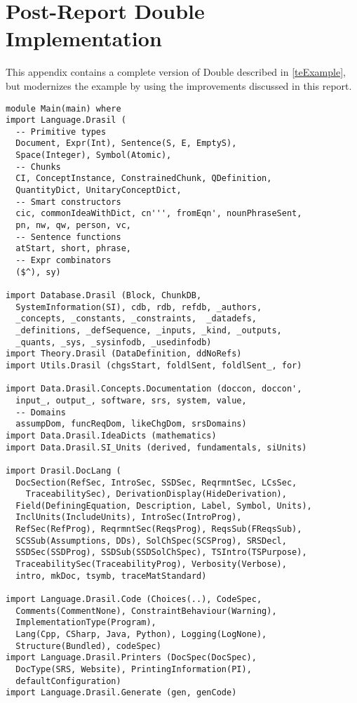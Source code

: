 \chapter{Post-Report Double Implementation}\label{a:modernDouble}
This appendix contains a complete version of Double described in \autoref{teExample}, but modernizes the example by using the improvements discussed in this report.
\begin{tcolorbox}[breakable, toprule at break=0pt, bottomrule at break=0pt]
\begin{verbatim}
module Main(main) where
import Language.Drasil (
  -- Primitive types
  Document, Expr(Int), Sentence(S, E, EmptyS),
  Space(Integer), Symbol(Atomic),
  -- Chunks
  CI, ConceptInstance, ConstrainedChunk, QDefinition,
  QuantityDict, UnitaryConceptDict,
  -- Smart constructors
  cic, commonIdeaWithDict, cn''', fromEqn', nounPhraseSent,
  pn, nw, qw, person, vc,
  -- Sentence functions
  atStart, short, phrase,
  -- Expr combinators
  ($^), sy)

import Database.Drasil (Block, ChunkDB,
  SystemInformation(SI), cdb, rdb, refdb, _authors,
  _concepts, _constants, _constraints,  _datadefs,
  _definitions, _defSequence, _inputs, _kind, _outputs,
  _quants, _sys, _sysinfodb, _usedinfodb)
import Theory.Drasil (DataDefinition, ddNoRefs)
import Utils.Drasil (chgsStart, foldlSent, foldlSent_, for)

import Data.Drasil.Concepts.Documentation (doccon, doccon',
  input_, output_, software, srs, system, value,
  -- Domains
  assumpDom, funcReqDom, likeChgDom, srsDomains)
import Data.Drasil.IdeaDicts (mathematics)
import Data.Drasil.SI_Units (derived, fundamentals, siUnits)

import Drasil.DocLang (
  DocSection(RefSec, IntroSec, SSDSec, ReqrmntSec, LCsSec,
    TraceabilitySec), DerivationDisplay(HideDerivation),
  Field(DefiningEquation, Description, Label, Symbol, Units),
  InclUnits(IncludeUnits), IntroSec(IntroProg),
  RefSec(RefProg), ReqrmntSec(ReqsProg), ReqsSub(FReqsSub),
  SCSSub(Assumptions, DDs), SolChSpec(SCSProg), SRSDecl,
  SSDSec(SSDProg), SSDSub(SSDSolChSpec), TSIntro(TSPurpose),
  TraceabilitySec(TraceabilityProg), Verbosity(Verbose),
  intro, mkDoc, tsymb, traceMatStandard)

import Language.Drasil.Code (Choices(..), CodeSpec,
  Comments(CommentNone), ConstraintBehaviour(Warning),
  ImplementationType(Program),
  Lang(Cpp, CSharp, Java, Python), Logging(LogNone),
  Structure(Bundled), codeSpec)
import Language.Drasil.Printers (DocSpec(DocSpec),
  DocType(SRS, Website), PrintingInformation(PI),
  defaultConfiguration)
import Language.Drasil.Generate (gen, genCode)


\end{verbatim}
\end{tcolorbox}
